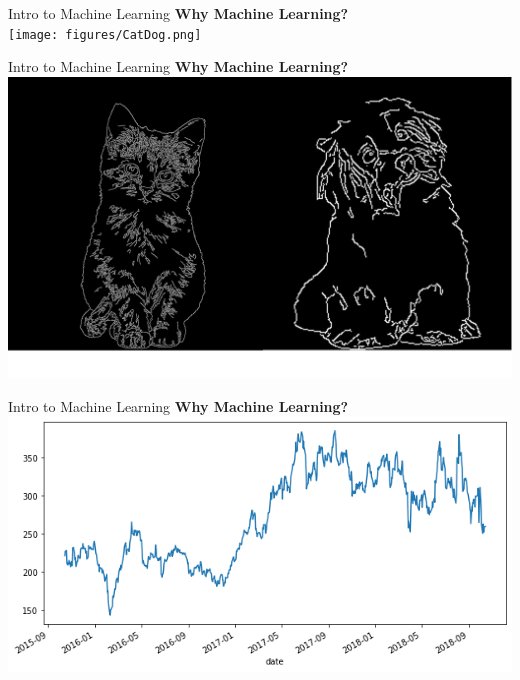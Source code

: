 \documentclass{beamer}
\begin{document}
\begin{frame}[fragile]{Intro to Machine Learning}
    \textbf{Why Machine Learning?}\\
    \texttt{[image: figures/CatDog.png]}%
\end{frame}
\begin{frame}[fragile]{Intro to Machine Learning}
    \textbf{Why Machine Learning?}\\
    \includegraphics[width=\textwidth,height=\textheight,keepaspectratio]{figures/CatDog_edge.png}%
\end{frame}
\begin{frame}[fragile]{Intro to Machine Learning}
    \textbf{Why Machine Learning?}
    \includegraphics[width=\textwidth,height=\textheight,keepaspectratio]{figures/Stock_block.png}
\end{frame}
\end{document}
